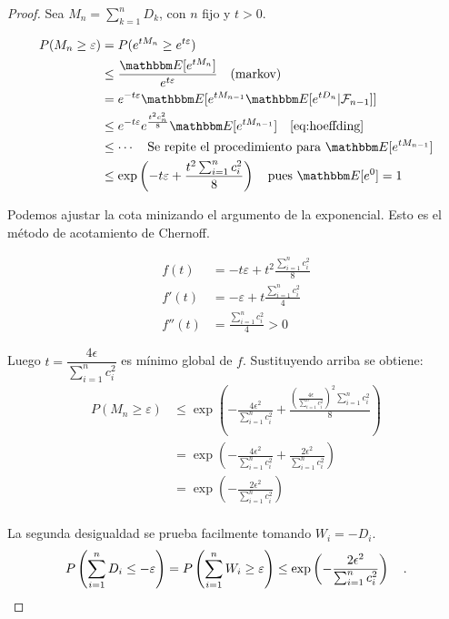 \begin{proof}
    Sea \(M_n = \sum^n_{k=1}D_k\), con \(n\) fijo y \(t>0\).

    \begin{align*}
        P(M_n \geq \varepsilon) &= P(e^{tM_n} \geq e^{t\varepsilon})\\
                                &\leq \dfrac{\E{e^{tM_n}}}{e^{t\varepsilon}} \quad \text{(markov)} \\
                                &= e^{-t\varepsilon} \E{e^{tM_{n-1}}\E{e^{tD_n} | \mathcal{F}_{n-1}}}  \\
                                &\leq e^{-t\varepsilon} e^{\frac{t^2c_n^2}{8}}\E{e^{tM_{n-1}}} \quad \eqref{eq:hoeffding} \\
                                &\leq \cdots \quad \text{Se repite el procedimiento para } \E{e^{tM_{n-1}}} \\
                                &\leq \operatorname{exp}\left(-t\varepsilon +\frac{t^2\sum^n_{i=1}c_i^2}{8}\right) \quad \text{pues } \E{e^0}=1
    \end{align*}

    Podemos ajustar la cota minizando el argumento de la exponencial. Esto es el método de acotamiento de Chernoff.

    \begin{align*}
        f(t) &= -t\varepsilon + t^2\frac{\sum^n_{i=1}c_i^2}{8} \\
        f'(t) &= -\varepsilon + t\frac{\sum^n_{i=1}c_i^2}{4} \\
        f''(t) &= \frac{\sum^n_{i=1}c_i^2}{4} > 0
    \end{align*}

    Luego \(t=\dfrac{4\epsilon}{\sum^n_{i=1}c_i^2}\) es mínimo global de \(f\). Sustituyendo arriba se obtiene:
    \begin{align*}
        P(M_n \geq \varepsilon)  &\leq \operatorname{exp}\left(-\frac{4\epsilon^2}{\sum^n_{i=1}c_i^2} +\frac{(\frac{4\epsilon}{\sum^n_{i=1}c_i^2})^2\sum^n_{i=1}c_i^2}{8}\right) \\
                                &= \operatorname{exp}\left(-\frac{4\epsilon^2}{\sum^n_{i=1}c_i^2} + \frac{2\epsilon^2}{\sum^n_{i=1}c_i^2}\right) \\
                                &= \operatorname{exp}\left(-\frac{2\epsilon^2}{\sum^n_{i=1}c_i^2}\right) \\
    \end{align*}

    La segunda desigualdad se prueba facilmente tomando \(W_i = -D_i\).
    \begin{align*}
        P\left(\sum^n_{i=1} D_i \leq -\varepsilon\right) = P\left(\sum^n_{i=1} W_i \geq \varepsilon\right) \leq \operatorname{exp}\left(-\frac{2\epsilon^2}{\sum^n_{i=1}c_i^2}\right) \quad \qedhere.
    \end{align*}
\end{proof}

